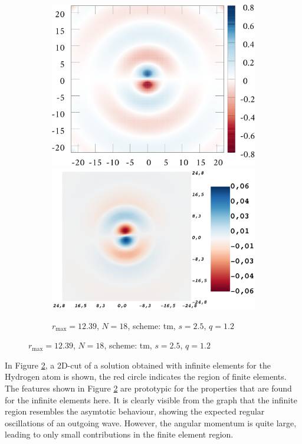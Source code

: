\begin{figure}
\begin{subfigure}{0.5\textwidth}
   \includegraphics[width=\textwidth]{Figures/RBF/P-Wave}
   \includegraphics[width=\textwidth]{Figures/RBF/p_wave}
   \caption{$r_\text{max}=12.39$, $N=18$, scheme: tm, $s=2.5$, $q=1.2$}
   \label{fig:cutInf}
\end{subfigure}
\end{figure}
In Figure \ref{fig:cutInf}, a 2D-cut of a solution obtained with infinite elements for the Hydrogen atom is shown, the red circle indicates the region of finite elements.
The features shown in Figure \ref{fig:cutInf} are prototypic for the properties that are found for the infinite elements here.
It is clearly visible from the graph that the infinite region resembles the asymtotic behaviour, showing the expected regular oscillations of an outgoing wave.
However, the angular momentum is quite large, leading to only small contributions in the finite element region.

